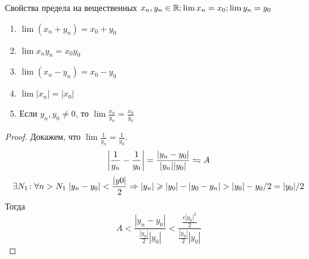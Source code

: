 \begin{theorem}{Свойства предела на вещественных}
$x_n, y_n \in \mathbb{R}; \lim x_n = x_0; \lim y_n = y_0$
\begin{enumerate}
\item $\lim (x_n + y_n) = x_0 + y_0$
\item $\lim x_ny_n = x_0y_0$
\item $\lim (x_n - y_n) = x_0 - y_0$
\item $\lim |x_n| = |x_0|$
\item Если $y_n, y_0 \ne 0$, то $\lim \frac{x_n}{y_n} = \frac{x_0}{y_0}$
\end{enumerate}
\end{theorem}
\begin{proof}
Докажем, что $\lim \frac1{y_n} = \frac1{y_0}$.
$$\left|\frac{1}{y_n} - \frac{1}{y_0}\right| = \frac{|y_n - y_0|}{|y_n||y_0|} \leftrightharpoons A$$
$$\exists N_1\colon \forall n > N_1\; |y_n-y_0| < \frac{|y0|}2 \Rightarrow |y_n| \geqslant |y_0| - |y_0 - y_n| > |y_0| - y_0 / 2 = |y_0|/2$$
Тогда
$$A < \frac{|y_n - y_0|}{\frac{|y_0|}2 |y_0|} < \frac{\frac{\epsilon|y_0|^2}2}{\frac{|y_0|}2 |y_0|}$$
\end{proof}
